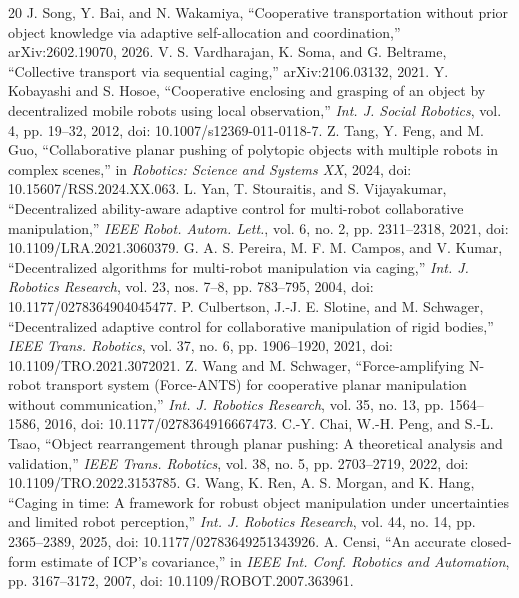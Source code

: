 \begin{thebibliography}{20}
 J. Song, Y. Bai, and N. Wakamiya, ``Cooperative transportation without prior object knowledge via adaptive self-allocation and coordination,'' arXiv:2602.19070, 2026.
 V. S. Vardharajan, K. Soma, and G. Beltrame, ``Collective transport via sequential caging,'' arXiv:2106.03132, 2021.
 Y. Kobayashi and S. Hosoe, ``Cooperative enclosing and grasping of an object by decentralized mobile robots using local observation,'' \emph{Int. J. Social Robotics}, vol. 4, pp. 19--32, 2012, doi: 10.1007/s12369-011-0118-7.
 Z. Tang, Y. Feng, and M. Guo, ``Collaborative planar pushing of polytopic objects with multiple robots in complex scenes,'' in \emph{Robotics: Science and Systems XX}, 2024, doi: 10.15607/RSS.2024.XX.063.
 L. Yan, T. Stouraitis, and S. Vijayakumar, ``Decentralized ability-aware adaptive control for multi-robot collaborative manipulation,'' \emph{IEEE Robot. Autom. Lett.}, vol. 6, no. 2, pp. 2311--2318, 2021, doi: 10.1109/LRA.2021.3060379.
 G. A. S. Pereira, M. F. M. Campos, and V. Kumar, ``Decentralized algorithms for multi-robot manipulation via caging,'' \emph{Int. J. Robotics Research}, vol. 23, nos. 7--8, pp. 783--795, 2004, doi: 10.1177/0278364904045477.
 P. Culbertson, J.-J. E. Slotine, and M. Schwager, ``Decentralized adaptive control for collaborative manipulation of rigid bodies,'' \emph{IEEE Trans. Robotics}, vol. 37, no. 6, pp. 1906--1920, 2021, doi: 10.1109/TRO.2021.3072021.
 Z. Wang and M. Schwager, ``Force-amplifying N-robot transport system (Force-ANTS) for cooperative planar manipulation without communication,'' \emph{Int. J. Robotics Research}, vol. 35, no. 13, pp. 1564--1586, 2016, doi: 10.1177/0278364916667473.
 C.-Y. Chai, W.-H. Peng, and S.-L. Tsao, ``Object rearrangement through planar pushing: A theoretical analysis and validation,'' \emph{IEEE Trans. Robotics}, vol. 38, no. 5, pp. 2703--2719, 2022, doi: 10.1109/TRO.2022.3153785.
 G. Wang, K. Ren, A. S. Morgan, and K. Hang, ``Caging in time: A framework for robust object manipulation under uncertainties and limited robot perception,'' \emph{Int. J. Robotics Research}, vol. 44, no. 14, pp. 2365--2389, 2025, doi: 10.1177/02783649251343926.
 A. Censi, ``An accurate closed-form estimate of ICP's covariance,'' in \emph{IEEE Int. Conf. Robotics and Automation}, pp. 3167--3172, 2007, doi: 10.1109/ROBOT.2007.363961.

\end{thebibliography}
